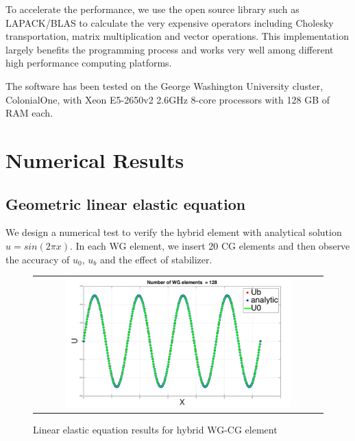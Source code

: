    To accelerate the performance, we use the open source library such as LAPACK/BLAS to calculate the very expensive operators including Cholesky transportation, matrix multiplication and vector operations. This implementation largely benefits the programming process and works very well among different high performance computing platforms.
   
   The software has been tested on the George Washington University cluster, ColonialOne, with Xeon E5-2650v2 2.6GHz 8-core processors with 128 GB of RAM each.
   
   \section{Numerical Results}
   
   \subsection{Geometric linear elastic equation}
   
   We design a numerical test to verify the hybrid element with analytical solution $ u = sin (2 \pi x) $. In each WG element, we insert 20 CG elements and then observe the accuracy of $ u_0 $, $ u_b $ and the effect of stabilizer.
   
      \begin{figure}[H]
      	\centering
      	\begin{tabular}{c}
      		\includegraphics[width=0.8\textwidth]{./pics/result1d1.png}
      	\end{tabular}
      	\caption{\footnotesize Linear elastic equation results for hybrid WG-CG element}
      \end{figure}
      
